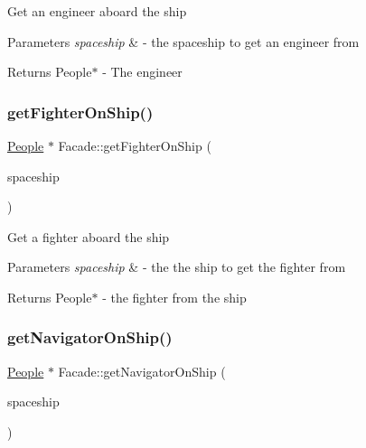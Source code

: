 Get an engineer aboard the ship 
\begin{DoxyParams}{Parameters}
{\em spaceship} & -\/ the spaceship to get an engineer from \\
\hline
\end{DoxyParams}
\begin{DoxyReturn}{Returns}
People$\ast$ -\/ The engineer 
\end{DoxyReturn}
\mbox{\label{classFacade_ad1ebea64b1784cc42842ccb3271c848b}} 
\subsubsection{\texorpdfstring{get\+Fighter\+On\+Ship()}{getFighterOnShip()}}
{\footnotesize\ttfamily \hyperlink{classPeople}{People} $\ast$ Facade\+::get\+Fighter\+On\+Ship (\begin{DoxyParamCaption}\item[{\hyperlink{classSpaceship}{Spaceship} $\ast$}]{spaceship }\end{DoxyParamCaption})}

Get a fighter aboard the ship 
\begin{DoxyParams}{Parameters}
{\em spaceship} & -\/ the the ship to get the fighter from \\
\hline
\end{DoxyParams}
\begin{DoxyReturn}{Returns}
People$\ast$ -\/ the fighter from the ship 
\end{DoxyReturn}
\mbox{\label{classFacade_aaf96fa03ebaa18acbd776e9f93545784}} 
\subsubsection{\texorpdfstring{get\+Navigator\+On\+Ship()}{getNavigatorOnShip()}}
{\footnotesize\ttfamily \hyperlink{classPeople}{People} $\ast$ Facade\+::get\+Navigator\+On\+Ship (\begin{DoxyParamCaption}\item[{\hyperlink{classSpaceship}{Spaceship} $\ast$}]{spaceship }\end{DoxyParamCaption})}

